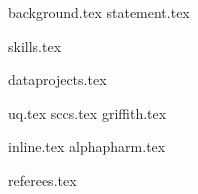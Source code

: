 \documentclass[hidelinks, 12pt]{article}
\begin{document}
{background.tex}
\vspace{-10mm}
{statement.tex}

\vspace{3mm}
{skills.tex}

\vspace{3mm}
\vspace{-5mm}
{dataprojects.tex}

\vspace{1mm}
{uq.tex}
\vspace{5mm}
{sccs.tex}
\vspace{5mm}
{griffith.tex}

\vspace{3mm}
\vspace{1mm}
{inline.tex}
\vspace{5mm}
{alphapharm.tex}

\vspace{3mm}
\vspace{1mm}
{referees.tex}
\end{document}

